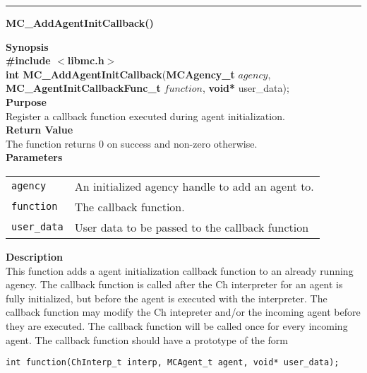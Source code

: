 \noindent
\vspace{5pt}
\rule{6.5in}{0.015in}
\noindent
{}
{\LARGE \bf MC\_AddAgentInitCallback()}\\
\label{api:MC_AddAgentInitCallback()}

\noindent
{\bf Synopsis}\\
{\bf \#include $<$libmc.h$>$}\\
{\bf int MC\_AddAgentInitCallback}({\bf MCAgency\_t} $agency$, {\bf MC\_AgentInitCallbackFunc\_t} $function$, {\bf void*} user\_data);\\

\noindent
{\bf Purpose}\\
Register a callback function executed during agent initialization.\\

\noindent
{\bf Return Value}\\
The function returns 0 on success and non-zero otherwise.\\

\noindent
{\bf Parameters}
\vspace{-0.1in}
\begin{description}
\item
\begin{tabular}{p{20 mm}p{145 mm}} 
\texttt{agency} & An initialized agency handle to add an agent to.\\
\texttt{function} & The callback function. \\
\texttt{user\_data} & User data to be passed to the callback function
\end{tabular}
\end{description}

\noindent
{\bf Description}\\
This function adds a agent initialization callback function to an already running agency.
The callback function is called after the Ch interpreter for an agent is fully initialized,
but before the agent is executed with the interpreter. The callback function may modify
the Ch intepreter and/or the incoming agent before they are executed. The callback
function will be called once for every incoming agent. The callback
function should have a prototype of the form

\begin{verbatim}
int function(ChInterp_t interp, MCAgent_t agent, void* user_data);
\end{verbatim}

